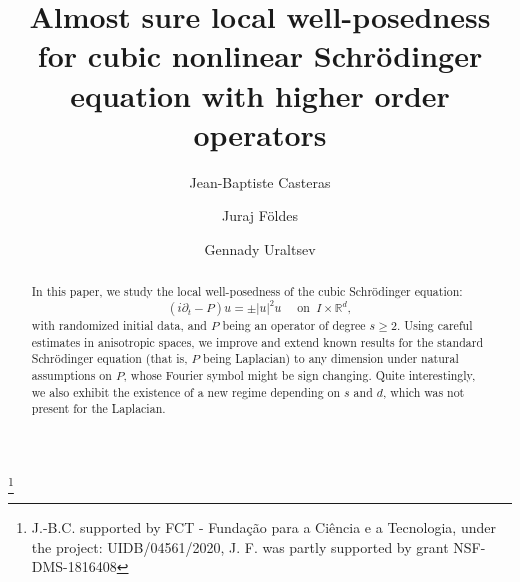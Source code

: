 \documentclass[10pt,leqno]{amsart}
\newcommand{\R}{\mathbb{R}}
\numberwithin{equation}{section}
\begin{document}
\title[Local well-posedness for cubic NLS]{Almost sure local well-posedness for cubic nonlinear Schr\" odinger equation with higher order operators}
\author[Jean-Baptiste Casteras]{Jean-Baptiste Casteras}
\address{CMAFcIO, Faculdade de Ci\^encias da Universidade de Lisboa, Edificio C6, Piso 1, Campo Grande 1749-016 Lisboa, Portugal}
\author[Juraj F\" oldes]{Juraj F\" oldes}
\address{Dept. of Mathematics, University of Virginia, 322 Kerchof Hall, Charlottesville, VA 22904-4137}
\author[Gennady Uraltsev]{Gennady Uraltsev}
\address{Dept. of Mathematics, University of Virginia, Kerchof Hall, Charlottesville, VA 22904-4137}
\thanks{J.-B.C. supported by FCT - Funda\c c\~ao para a Ci\^encia e a Tecnologia, under the project: UIDB/04561/2020, J. F. was partly supported by grant NSF-DMS-1816408}


\begin{abstract}
In this paper, we study the local well-posedness of the cubic  Schr\" odinger equation:
$$ (i\partial_t - P) u = \pm |u|^2 u\quad \textrm{ on }\ I\times \R^d ,$$
with randomized initial data, and $P$ being an operator of degree $s \geq 2$. Using careful estimates in anisotropic spaces, we improve and extend known results for the standard Schr\" odinger equation 
(that is, $P$ being  Laplacian) to any dimension under natural assumptions on $P$, whose Fourier symbol might be sign changing. 
Quite interestingly, we  also exhibit the existence of a new regime depending on $s$ and $d$, which was not present for the Laplacian. 

\end{abstract}

\maketitle
\end{document}
